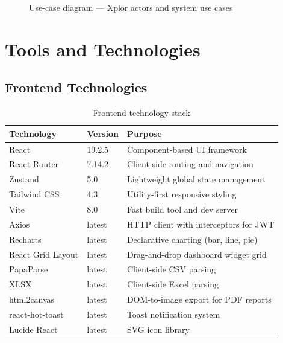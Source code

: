 \documentclass[12pt,a4paper]{report}
\begin{document}
\begin{figure}[H]
\caption{Use-case diagram --- Xplor actors and system use cases}
\label{fig:usecase}
\end{figure}

\chapter{Tools and Technologies}

\section{Frontend Technologies}

\begin{table}[H]
\centering
\caption{Frontend technology stack}
\begin{tabularx}{\textwidth}{llX}
\toprule
\textbf{Technology} & \textbf{Version} & \textbf{Purpose} \\
\midrule
React           & 19.2.5 & Component-based UI framework \\
React Router    & 7.14.2 & Client-side routing and navigation \\
Zustand         & 5.0    & Lightweight global state management \\
Tailwind CSS    & 4.3    & Utility-first responsive styling \\
Vite            & 8.0    & Fast build tool and dev server \\
Axios           & latest & HTTP client with interceptors for JWT \\
Recharts        & latest & Declarative charting (bar, line, pie) \\
React Grid Layout & latest & Drag-and-drop dashboard widget grid \\
PapaParse       & latest & Client-side CSV parsing \\
XLSX            & latest & Client-side Excel parsing \\
html2canvas     & latest & DOM-to-image export for PDF reports \\
react-hot-toast & latest & Toast notification system \\
Lucide React    & latest & SVG icon library \\
\bottomrule
\end{tabularx}
\end{table}
\end{document}
